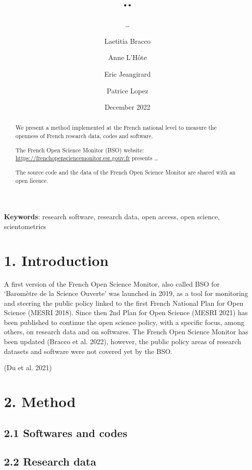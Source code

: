 \documentclass[
]{article}
\title{..}
\subtitle{\ldots{}}
\author[%
  2%
  ]{%
  Laetitia Bracco%
}
\author[%
  1%
  ]{%
  Anne L'Hôte%
}
\author[%
  1%
  ]{%
  Eric Jeangirard%
}
\author[%
  3%
  ]{%
  Patrice Lopez%
}
\affil[1]{French Ministry of Higher Education, Research, Paris, France}
\affil[2]{University of Lorraine, France}
\affil[3]{Science-miner, Naves, France}
\date{December 2022}
\begin{document}
\maketitle
\begin{abstract}
We present a method implemented at the French national level to measure
the openness of French research data, codes and software.

The French Open Science Monitor (BSO) website:
\url{https://frenchopensciencemonitor.esr.gouv.fr} presents \ldots{}

The source code and the data of the French Open Science Monitor are
shared with an open licence.
\end{abstract}

\textbf{Keywords}: research software, research data, open access, open
science, scientometrics

\hypertarget{introduction}{%
\section{1. Introduction}\label{introduction}}

A first version of the French Open Science Monitor, also called BSO for
`Baromètre de la Science Ouverte' was launched in 2019, as a tool for
monitoring and steering the public policy linked to the first French
National Plan for Open Science (MESRI 2018). Since then 2nd Plan for
Open Science (MESRI 2021) has been published to continue the open
science policy, with a specific focus, among others, on research data
and on softwares. The French Open Science Monitor has been updated
(Bracco et al. 2022), however, the public policy areas of research
datasets and software were not covered yet by the BSO.

(Du et al. 2021)

\hypertarget{method}{%
\section{2. Method}\label{method}}

\hypertarget{softwares-and-codes}{%
\subsection{2.1 Softwares and codes}\label{softwares-and-codes}}

\hypertarget{research-data}{%
\subsection{2.2 Research data}\label{research-data}}
\end{document}
